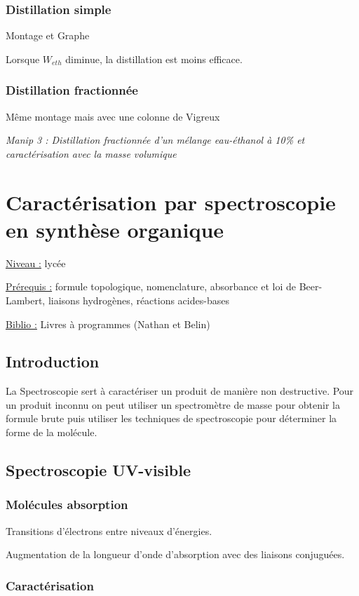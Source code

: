 \documentclass{article}%
\begin{document}
\subsubsection{Distillation simple}
Montage et Graphe

Lorsque $W_{eth}$ diminue, la distillation est moins efficace.
\subsubsection{Distillation fractionnée}
Même montage mais avec une colonne de Vigreux

\textit{Manip 3 : Distillation fractionnée d'un mélange eau-éthanol à 10\% et caractérisation avec la masse volumique}
\section{Caractérisation par spectroscopie en synthèse organique}

\underline{Niveau :} lycée

\underline{Prérequis :} formule topologique, nomenclature, absorbance et loi de Beer-Lambert, liaisons hydrogènes, réactions acides-bases

\underline{Biblio :} Livres à programmes (Nathan et Belin) 
\subsection{Introduction}

La Spectroscopie sert à caractériser un produit de manière non destructive. Pour un produit inconnu on peut utiliser un spectromètre de masse pour obtenir la formule brute puis utiliser les techniques de spectroscopie pour déterminer la forme de la molécule.

\subsection{Spectroscopie UV-visible}
\subsubsection{Molécules absorption}
Transitions d'électrons entre niveaux d'énergies. 

Augmentation de la longueur d'onde d'absorption avec des liaisons conjuguées.
\subsubsection{Caractérisation}
\end{document}
